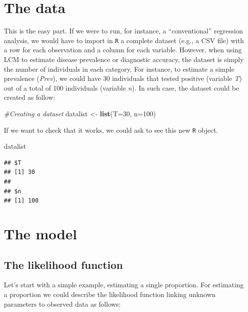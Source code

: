 \documentclass[
]{book}
\newenvironment{Shaded}{\begin{snugshade}}{\end{snugshade}}
\newcommand{\AttributeTok}[1]{\textcolor[rgb]{0.13,0.29,0.53}{#1}}
\newcommand{\CommentTok}[1]{\textcolor[rgb]{0.56,0.35,0.01}{\textit{#1}}}
\newcommand{\DecValTok}[1]{\textcolor[rgb]{0.00,0.00,0.81}{#1}}
\newcommand{\FunctionTok}[1]{\textcolor[rgb]{0.13,0.29,0.53}{\textbf{#1}}}
\newcommand{\NormalTok}[1]{#1}
\newcommand{\OtherTok}[1]{\textcolor[rgb]{0.56,0.35,0.01}{#1}}
\begin{document}
\section{The data}\label{the-data}

This is the easy part. If we were to run, for instance, a ``conventional'' regression analysis, we would have to import in \texttt{R} a complete dataset (e.g., a CSV file) with a row for each observation and a column for each variable. However, when using LCM to estimate disease prevalence or diagnostic accuracy, the dataset is simply the number of individuals in each category. For instance, to estimate a simple prevalence (\emph{Prev}), we could have 30 individuals that tested positive (variable \emph{T}) out of a total of 100 individuals (variable \emph{n}). In such case, the dataset could be created as follow:

\begin{Shaded}
\begin{Highlighting}[]
\CommentTok{\#Creating a dataset}
\NormalTok{datalist }\OtherTok{\textless{}{-}} \FunctionTok{list}\NormalTok{(}\AttributeTok{T=}\DecValTok{30}\NormalTok{, }\AttributeTok{n=}\DecValTok{100}\NormalTok{)}
\end{Highlighting}
\end{Shaded}

If we want to check that it works, we could ask to see this new \texttt{R} object.

\begin{Shaded}
\begin{Highlighting}[]
\NormalTok{datalist}
\end{Highlighting}
\end{Shaded}

\begin{verbatim}
## $T
## [1] 30
## 
## $n
## [1] 100
\end{verbatim}

\section{The model}\label{the-model}

\subsection{The likelihood function}\label{the-likelihood-function}

Let's start with a simple example, estimating a single proportion. For estimating a proportion we could describe the likelihood function linking unknown parameters to observed data as follows:
\end{document}
